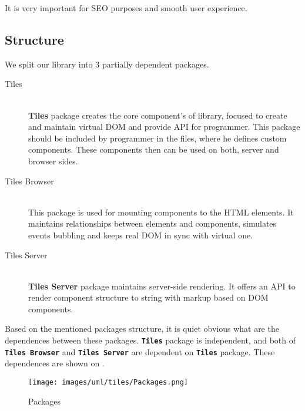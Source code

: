     It is very important for SEO purposes and smooth user experience. 

  \subsection{Structure}\label{subsec:our-architecture-structure}

    We split our library into 3 partially dependent packages. 
    \begin{description}
      \item[Tiles] \hfill \\
        \textbf{Tiles} package creates the core component's of library, focused to create and maintain virtual DOM and provide API for programmer.
        This package should be included by programmer in the files, where he defines custom components. 
        These components then can be used on both, server and browser sides.
      \item[Tiles Browser] \hfill \\
        This package is used for mounting components to the HTML elements. 
        It maintains relationships between elements and components, 
        simulates events bubbling and keeps real DOM in sync with virtual one.
      \item[Tiles Server] \hfill \\
        \textbf{Tiles Server} package maintains server-side rendering. It offers an API to render component structure to string with markup based on DOM components.
    \end{description}

    Based on the mentioned packages structure, it is quiet obvious what are the dependences between these packages.
    \texttt{\textbf{Tiles}} package is independent, 
    and both of \texttt{\textbf{Tiles Browser}} and \texttt{\textbf{Tiles Server}} are dependent on \texttt{\textbf{Tiles}} package.
    These dependences are shown on .

    \begin{figure}[h]
    \centering  
      \texttt{[image: images/uml/tiles/Packages.png]}
      \caption{Packages}
      \label{img:library-packages}
    \end{figure}

